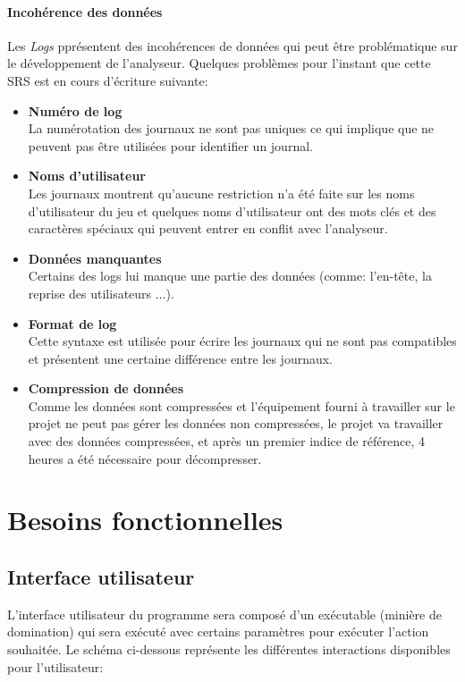 \documentclass{scrreprt}
\begin{document}
\subsubsection{Incohérence des données}
Les \textit{Logs} pprésentent des incohérences de données qui peut être problématique sur le développement de l'analyseur. Quelques problèmes pour l'instant que cette SRS est en cours d'écriture  suivante:

\begin{itemize}
  \item \textbf{Numéro de log}\\
   La numérotation des journaux ne sont pas uniques ce qui implique que ne peuvent pas être utilisées pour identifier un journal.
  \item \textbf{Noms d'utilisateur}\\
    Les journaux montrent qu'aucune restriction n’a été faite sur les noms d'utilisateur du jeu et quelques noms d'utilisateur ont des mots clés et des caractères spéciaux qui peuvent entrer en conflit avec l'analyseur.
   \item \textbf{Données manquantes}\\
    Certains des logs lui manque une partie des données (comme: l'en-tête, la reprise des utilisateurs $\ldots$).
   \item \textbf{Format de log}\\
    Cette syntaxe est utilisée pour écrire les journaux qui ne sont pas compatibles et présentent une certaine différence entre les journaux.
    \item \textbf{Compression de données}\\
     Comme les données sont compressées et l'équipement fourni à travailler sur le projet ne peut pas gérer les données non compressées, le projet va travailler avec des données compressées, et après un premier indice de référence, 4 heures a été nécessaire pour décompresser.
\end{itemize}

\chapter{Besoins fonctionnelles}

\section{Interface utilisateur}
L'interface utilisateur du programme sera composé d'un exécutable (minière de domination) qui sera exécuté avec certains paramètres pour exécuter l'action souhaitée. Le schéma ci-dessous représente les différentes interactions disponibles pour l'utilisateur:\\
\end{document}
